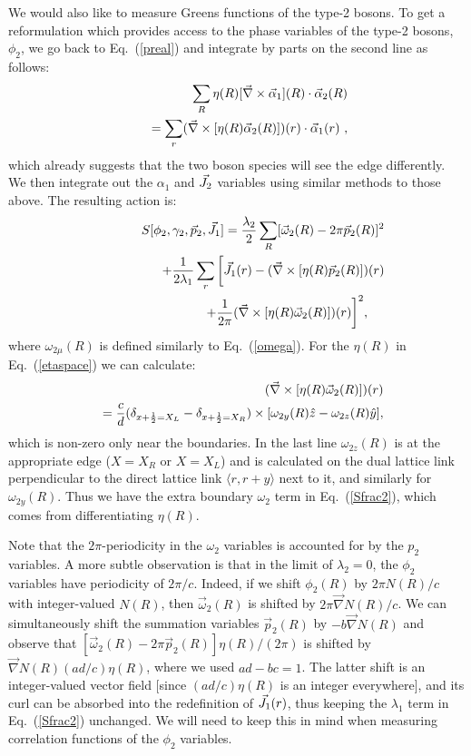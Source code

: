 We would also like to measure Greens functions of the type-2 bosons.  To get a reformulation which provides access to the phase variables of the type-2 bosons, $\phi_2$, we go back to Eq.~(\ref{preal}) and integrate by parts on the second line as follows:
\begin{eqnarray}
&& \sum_R \eta(R) [\vec{\nabla}\times\vec{\alpha}_{1}](R) \cdot \vec{\alpha}_{2}(R) \nonumber\\
&& ~~~ = \sum_r (\vec{\nabla}\times[\eta(R)\vec{\alpha}_2(R)])(r)\cdot \vec{\alpha}_1(r) ~,
\end{eqnarray}
which already suggests that the two boson species will see the edge differently.
We then integrate out the $\alpha_1$ and $\vec{J}_2$ variables using similar methods to those above. The resulting action is:
\begin{eqnarray}
&&S[\phi_2,\gamma_2,\vec{p}_2,\vec{J}_1]=
\frac{\lambda_2}{2}\sum_R [\vec{\omega}_{2}(R)-2\pi \vec{p}_{2}(R)]^2\nonumber\\
&& ~~~ +\frac{1}{2\lambda_1}\sum_r \bigg[\vec{J}_1(r)-(\vec{\nabla}\times[\eta(R)\vec{p}_2(R)])(r)\nonumber\\
&& ~~~~~~~~~~~~~~~~~~~~~~~~~ + \frac{1}{2\pi}(\vec{\nabla}\times[\eta(R)\vec{\omega}_2(R)])(r) \bigg]^2 , ~~~~
\label{Sfrac2}
\end{eqnarray}
where $\omega_{2\mu}(R)$ is defined similarly to Eq.~(\ref{omega}). For the $\eta(R)$ in Eq.~(\ref{etaspace}) we can calculate:
\begin{eqnarray}
&&(\vec{\nabla}\times[\eta(R)\vec{\omega}_{2}(R)])(r) \nonumber\\
&& = \frac{c}{d}(\delta_{x+\frac{1}{2}=X_L}-\delta_{x+\frac{1}{2}=X_R})\times
[\omega_{2y}(R)\hat{z}
-\omega_{2z}(R)\hat{y}]\nonumber,
\end{eqnarray}
which is non-zero only near the boundaries.  In the last line $\omega_{2z}(R)$ is at the appropriate edge ($X=X_R$ or $X=X_L$) and is calculated on the dual lattice link perpendicular to the direct lattice link $\langle r, r+\hat{y}\rangle$ next to it, and similarly for $\omega_{2y}(R)$.
Thus we have the extra boundary $\omega_2$ term in Eq.~(\ref{Sfrac2}), which comes from differentiating $\eta(R)$. 

Note that the $2\pi$-periodicity in the $\omega_2$ variables is accounted for by the $p_2$ variables.  A more subtle observation is that in the limit of $\lambda_2 = 0$, the $\phi_2$ variables have periodicity of $2\pi/c$.  Indeed, if we shift $\phi_2(R)$ by $2\pi N(R)/c$ with integer-valued $N(R)$, then $\vec{\omega}_2(R)$ is shifted by $2\pi \vec{\nabla}N(R)/c$.  We can simultaneously shift the summation variables $\vec{p}_2(R)$ by $-b\vec{\nabla}N(R)$ and observe that $[\vec{\omega}_2(R) - 2\pi \vec{p}_2(R)] \eta(R)/(2\pi)$ is shifted by $\vec{\nabla}N(R) (ad/c)\eta(R)$, where we used $ad - bc = 1$.  The latter shift is an integer-valued vector field [since $(ad/c)\eta(R)$ is an integer everywhere], and its curl can be absorbed into the redefinition of ${\vec{J}}_1(r)$, thus keeping the $\lambda_1$ term in Eq.~(\ref{Sfrac2}) unchanged.  We will need to keep this in mind when measuring correlation functions of the $\phi_2$ variables.

